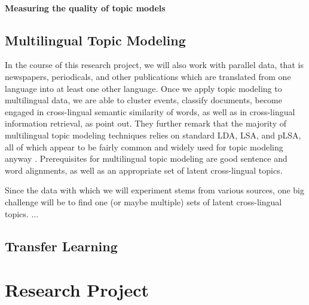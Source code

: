 \paragraph{Measuring the quality of topic models} 

\subsection{Multilingual Topic Modeling}
In the course of this research project, we will also work with parallel data, that is newspapers, periodicals, and other publications which are translated from one language into at least one other language. Once we apply topic modeling to multilingual data, we are able to cluster events, classify documents, become engaged in cross-lingual semantic similarity of words, as well as in cross-lingual information retrieval, as \citet{vulicprobabilistic2015} point out. They further remark that the majority of multilingual topic modeling techniques relies on standard LDA, LSA, and pLSA, all of which appear to be fairly common and widely used for topic modeling anyway \citep{dumaisautomatic1997,mimnopolylingual2009,zhangcrosslingual2010,nicross2011}. Prerequisites for multilingual topic modeling are good sentence and word alignments, as well as an appropriate set of latent cross-lingual topics.

Since the data with which we will experiment stems from various sources, one big challenge will be to find one (or maybe multiple) sets of latent cross-lingual topics.  ...

\subsection{Transfer Learning}

\section{Research Project}

